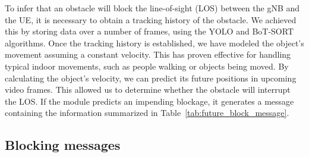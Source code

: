 To infer that an obstacle will block the line-of-sight (LOS) between the gNB and the UE, it is necessary to obtain a tracking history of the obstacle.
We achieved this by storing data over a number of frames, using the YOLO and BoT-SORT algorithms.
Once the tracking history is established, we have modeled the object's movement assuming a constant velocity.
This has proven effective for handling typical indoor movements, such as people walking or objects being moved.
By calculating the object's velocity, we can predict its future positions in upcoming video frames.
This allowed us to determine whether the obstacle will interrupt the LOS\@.
If the module predicts an impending blockage, it generates a message containing the information summarized in Table~\ref{tab:future_block_message}.


\begin{table}[H]
    \caption{Components of the Prediction of Blockage Payload}
    \label{tab:future_block_message}
    \centering
\end{table}




\subsection{Blocking messages}

